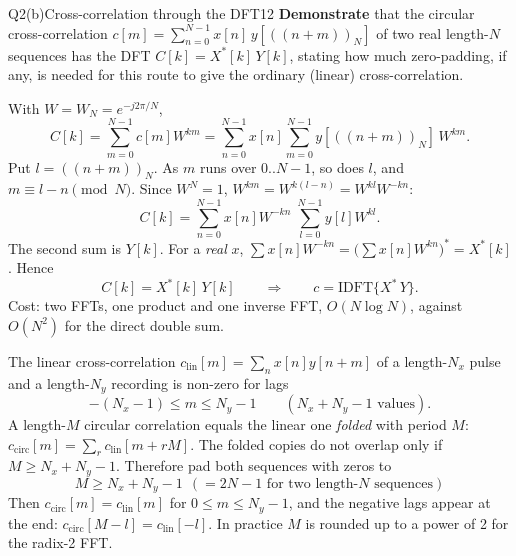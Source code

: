 \begin{qcard}{Q2(b)}{Cross-correlation through the DFT}{12}
\textbf{Demonstrate} that the circular cross-correlation $c[m]=\sum_{n=0}^{N-1}x[n]\,y[((n+m))_N]$ of two real length-$N$ sequences has the DFT $C[k]=X^*[k]\,Y[k]$, stating how much zero-padding, if any, is needed for this route to give the ordinary (linear) cross-correlation.
\end{qcard}
\begin{solution}
 With $W=W_N=e^{-j2\pi/N}$,
\[C[k]=\sum_{m=0}^{N-1}c[m]W^{km}=\sum_{n=0}^{N-1}x[n]\sum_{m=0}^{N-1}y[((n+m))_N]\,W^{km}.\]
 Put $l=((n+m))_N$. As $m$ runs over $0..N-1$, so does $l$, and $m\equiv l-n\pmod N$. Since $W^N=1$, $W^{km}=W^{k(l-n)}=W^{kl}W^{-kn}$:
\[C[k]=\sum_{n=0}^{N-1}x[n]W^{-kn}\;\sum_{l=0}^{N-1}y[l]W^{kl}.\]
 The second sum is $Y[k]$. For a \emph{real} $x$, $\sum x[n]W^{-kn}=\Big(\sum x[n]W^{kn}\Big)^*=X^*[k]$. Hence
\[\boxed{C[k]=X^*[k]\,Y[k]}\qquad\Longrightarrow\qquad c=\mathrm{IDFT}\{X^*\,Y\}.\]
Cost: two FFTs, one product and one inverse FFT, $O(N\log N)$, against $O(N^2)$ for the direct double sum.

 The linear cross-correlation $c_{\text{lin}}[m]=\sum_nx[n]y[n+m]$ of a length-$N_x$ pulse and a length-$N_y$ recording is non-zero for lags
\[-(N_x-1)\le m\le N_y-1\qquad(N_x+N_y-1\text{ values}).\]
A length-$M$ circular correlation equals the linear one \emph{folded} with period $M$: $c_{\text{circ}}[m]=\sum_rc_{\text{lin}}[m+rM]$. The folded copies do not overlap only if $M\ge N_x+N_y-1$. Therefore pad both sequences with zeros to
\[\boxed{M\ge N_x+N_y-1\ \ (=2N-1\text{ for two length-}N\text{ sequences})}\]
Then $c_{\text{circ}}[m]=c_{\text{lin}}[m]$ for $0\le m\le N_y-1$, and the negative lags appear at the end: $c_{\text{circ}}[M-l]=c_{\text{lin}}[-l]$. In practice $M$ is rounded up to a power of 2 for the radix-2 FFT.
\end{solution}

